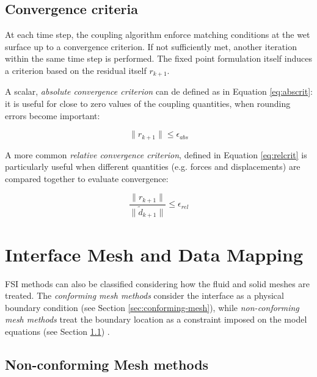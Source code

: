 \subsection{Convergence criteria}
\label{sec:convergence}

At each time step, the coupling algorithm enforce matching conditions at the wet surface up to a convergence criterion. If not sufficiently met, another iteration within the same time step is performed. The fixed point formulation itself induces a criterion based on the residual itself $r_{k+1}$.

A scalar, \textit{absolute convergence criterion} can de defined as in Equation \ref{eq:abscrit}: it is useful for close to zero values of the coupling quantities, when rounding errors become important:

\begin{equation}
	\lVert r_{k+1} \rVert \leq \epsilon_{abs}
	\label{eq:abscrit}
\end{equation}

A more common \textit{relative convergence criterion}, defined in Equation \ref{eq:relcrit} is particularly useful when different quantities (e.g. forces and displacements) are compared together to evaluate convergence:


\begin{equation}
	\frac{\lVert  r_{k+1} \rVert}{\lVert  \tilde{d}_{k+1} \rVert} \leq \epsilon_{rel}
	\label{eq:relcrit}
\end{equation}



\section{Interface Mesh and Data Mapping}
\label{sec:interface-mesh}

FSI methods can also be classified considering how the fluid and solid meshes are treated. The \textit{conforming mesh methods} consider the interface as a physical boundary condition (see Section \ref{sec:conforming-mesh}), while \textit{non-conforming mesh methods} treat the boundary location as a constraint imposed on the model equations (see Section \ref{sec:nonconforming-mesh}) \cite{hou2012numerical}.


\subsection{Non-conforming Mesh methods}
\label{sec:nonconforming-mesh}

